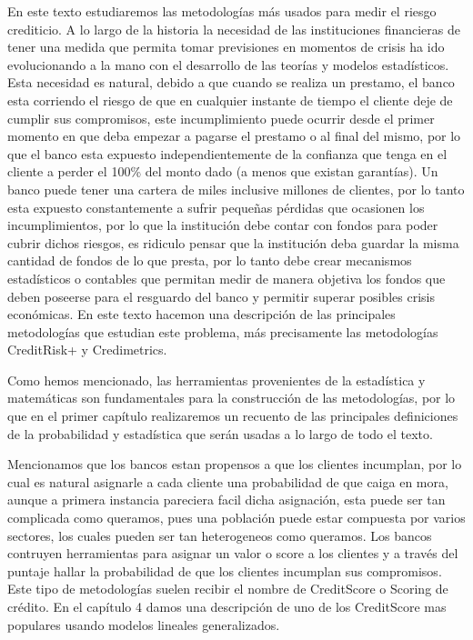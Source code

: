 \documentclass[
  12pt,
]{krantz}
\theoremstyle{definition}
\theoremstyle{definition}
\theoremstyle{definition}
\theoremstyle{remark}
\begin{document}
En este texto estudiaremos las metodologías más usados para medir el riesgo crediticio. A lo largo de la historia la necesidad de las instituciones financieras de tener una medida que permita tomar previsiones en momentos de crisis ha ido evolucionando a la mano con el desarrollo de las teorías y modelos estadísticos. Esta necesidad es natural, debido a que cuando se realiza un prestamo, el banco esta corriendo el riesgo de que en cualquier instante de tiempo el cliente deje de cumplir sus compromisos, este incumplimiento puede ocurrir desde el primer momento en que deba empezar a pagarse el prestamo o al final del mismo, por lo que el banco esta expuesto independientemente de la confianza que tenga en el cliente a perder el 100\% del monto dado (a menos que existan garantías). Un banco puede tener una cartera de miles inclusive millones de clientes, por lo tanto esta expuesto constantemente a sufrir pequeñas pérdidas que ocasionen los incumplimientos, por lo que la institución debe contar con fondos para poder cubrir dichos riesgos, es ridiculo pensar que la institución deba guardar la misma cantidad de fondos de lo que presta, por lo tanto debe crear mecanismos estadísticos o contables que permitan medir de manera objetiva los fondos que deben poseerse para el resguardo del banco y permitir superar posibles crisis económicas. En este texto hacemon una descripción de las principales metodologías que estudian este problema, más precisamente las metodologías CreditRisk+ y Credimetrics.

Como hemos mencionado, las herramientas provenientes de la estadística y matemáticas son fundamentales para la construcción de las metodologías, por lo que en el primer capítulo realizaremos un recuento de las principales definiciones de la probabilidad y estadística que serán usadas a lo largo de todo el texto.

Mencionamos que los bancos estan propensos a que los clientes incumplan, por lo cual es natural asignarle a cada cliente una probabilidad de que caiga en mora, aunque a primera instancia pareciera facil dicha asignación, esta puede ser tan complicada como queramos, pues una población puede estar compuesta por varios sectores, los cuales pueden ser tan heterogeneos como queramos. Los bancos contruyen herramientas para asignar un valor o score a los clientes y a través del puntaje hallar la probabilidad de que los clientes incumplan sus compromisos. Este tipo de metodologías suelen recibir el nombre de CreditScore o Scoring de crédito. En el capítulo 4 damos una descripción de uno de los CreditScore mas populares usando modelos lineales generalizados.
\end{document}
